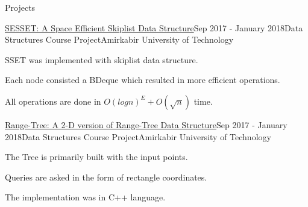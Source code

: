 \documentclass{resume} %
\begin{document}
\begin{rSection}{Projects}
		
		\begin{rSubsection}{\href{https://github.com/pouyaaghahoseini/DS-Course/tree/master/SE-Skiplist}{SESSET: A Space Efficient Skiplist Data Structure}}{Sep 2017 - January 2018}{Data Structures Course Project}{Amirkabir University of Technology}
			\item SSET‌ was implemented with skiplist data structure.
			\item Each node consisted a BDeque which resulted in more efficient operations.
			\item All operations are done in $O(logn)^{E} + O(\sqrt{n})$ time.
		\end{rSubsection}
		
		
		\begin{rSubsection}{\href{https://github.com/pouyaaghahoseini/DS-Course}{Range-Tree: A 2-D version of Range-Tree Data Structure}}{Sep 2017 - January 2018}{Data Structures Course Project}{Amirkabir University of Technology}
			\item The Tree is primarily built with the input points.
			\item Queries are asked in the form of rectangle coordinates. 
			\item The implementation was in C++ language.
			
		\end{rSubsection}
		
		
		
	\end{rSection}
\end{document}

